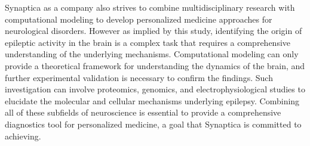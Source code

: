 Synaptica as a company also strives to combine multidisciplinary research with computational modeling to develop personalized medicine approaches for neurological disorders.
However as implied by this study, identifying the origin of epileptic activity in the brain is a complex task that requires a comprehensive understanding of the underlying mechanisms.
Computational modeling can only provide a theoretical framework for understanding the dynamics of the brain, and further experimental validation is necessary to confirm the findings.
Such investigation can involve proteomics, genomics, and electrophysiological studies to elucidate the molecular and cellular mechanisms underlying epilepsy.
Combining all of these subfields of neuroscience is essential to provide a comprehensive diagnostics tool for personalized medicine, a goal that Synaptica is committed to achieving.